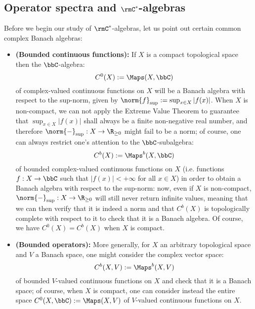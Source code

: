     \subsection{Operator spectra and \texorpdfstring{$\rmC^*$}{}-algebras}
        \begin{example}
            Before we begin our study of $\rmC^*$-algebras, let us point out certain common complex Banach algebras:
            \begin{itemize}
                \item \textbf{(Bounded continuous functions):} If $X$ is a compact topological space then the $\bbC$-algebra:
                    $$C^0(X) := \Maps(X, \bbC)$$
                of complex-valued continuous functions on $X$ will be a Banach algebra with respect to the sup-norm, given by $\norm{f}_{\sup} := \sup_{x \in X} |f(x)|$. When $X$ is non-compact, we can not apply the Extreme Value Theorem to guarantee that $\sup_{x \in X} |f(x)|$ shall always be a finite non-negative real number, and therefore $\norm{-}_{\sup}: X \to \R_{\geq 0}$ might fail to be a norm; of course, one can always restrict one's attention to the $\bbC$-subalgebra:
                    $$C^b(X) := \Maps^b(X, \bbC)$$
                of bounded complex-valued continuous functions on $X$ (i.e. functions $f: X \to \bbC$ such that $|f(x)| < +\infty$ for all $x \in X$) in order to obtain a Banach algebra with respect to the sup-norm: now, even if $X$ is non-compact, $\norm{-}_{\sup}: X \to \R_{\geq 0}$ will still never return infinite values, meaning that we can then verify that it is indeed a norm and that $C^b(X)$ is topologically complete with respect to it to check that it is a Banach algebra. Of course, we have $C^0(X) = C^b(X)$ when $X$ is compact. 
                \item \textbf{(Bounded operators):} More generally, for $X$ an arbitrary topological space and $V$ a Banach space, one might consider the complex vector space:
                    $$C^b(X, V) := \Maps^b(X, V)$$
                of bounded $V$-valued continuous functions on $X$ and check that it is a Banach space; of course, when $X$ is compact, one can consider instead the entire space $C^0(X, \bbC) := \Maps(X, V)$ of $V$-valued continuous functions on $X$.
                

\end{itemize}
\end{example}
